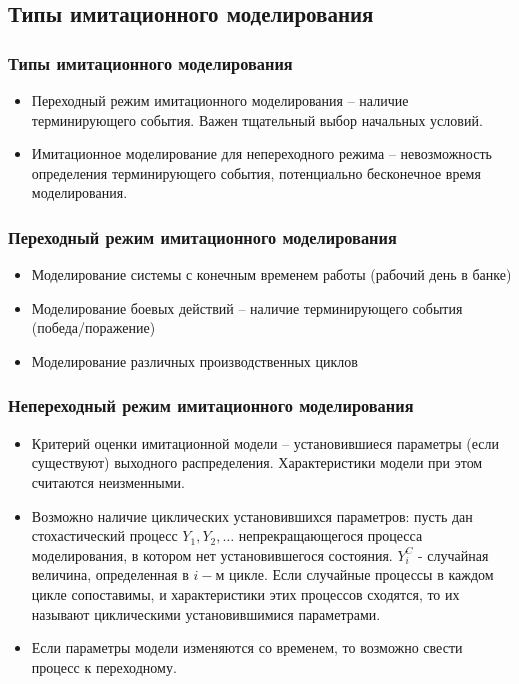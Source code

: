 \documentclass[utf8]{beamer}
\begin{document}
\subsection{Типы имитационного моделирования}
\begin{frame}
\frametitle{Типы имитационного моделирования}
\begin{itemize}
	\item Переходный режим имитационного моделирования -- наличие терминирующего события. Важен тщательный выбор начальных условий.
	\item Имитационное моделирование для непереходного режима -- невозможность определения терминирующего события, потенциально бесконечное время моделирования.
\end{itemize}

\end{frame}
\begin{frame}
\frametitle{Переходный режим имитационного моделирования}
\begin{itemize}
	\item Моделирование системы с конечным временем работы (рабочий день в банке)
	\item Моделирование боевых действий -- наличие терминирующего события (победа/поражение)
	\item Моделирование различных производственных циклов
\end{itemize}
\end{frame}
\begin{frame}
\frametitle{Непереходный режим имитационного моделирования}
\begin{itemize}
	\item Критерий оценки имитационной модели -- установившиеся параметры (если существуют) выходного распределения. Характеристики модели при этом считаются неизменными.
	\item Возможно наличие циклических установившихся параметров: пусть дан стохастический процесс $Y_1, Y_2, \ldots$ непрекращающегося процесса моделирования, в котором нет установившегося состояния. $Y_i^C$ - случайная величина, определенная в $i-$м цикле. Если случайные процессы в каждом цикле сопоставимы, и характеристики этих процессов сходятся, то их называют циклическими установившимися параметрами.
	\item Если параметры модели изменяются со временем, то возможно свести процесс к переходному.
\end{itemize}
\end{frame}
\end{document}

